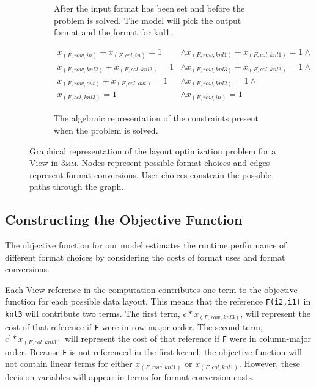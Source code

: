 \documentclass[sigconf,review=true]{acmart}
\begin{document}
\begin{figure}
\begin{subfigure}[t]{0.2\textwidth}
		\caption{After the input format has been set and before the problem is solved. The model will pick the output format and the format for knl1.}
		\label{graphModel:4}
	\end{subfigure}

	\vspace{5px}

	\begin{subfigure}{0.45\textwidth}
		\begin{align*}
			x_{(F,row,in)} + x_{(F,col,in)} = 1 &\wedge 
		x_{(F,row,knl1)} + x_{(F,col,knl1)} = 1 \wedge \\
		x_{(F,row,knl2)} + x_{(F,col,knl2)} = 1 &\wedge 
		x_{(F,row,knl3)} + x_{(F,col,knl3)} = 1 \wedge \\
		x_{(F,row,out)} + x_{(F,col,out)} = 1 &\wedge 
		x_{(F,row,knl2)} = 1 \wedge\\
		 x_{(F,col,knl3)} = 1 &\wedge x_{(F,row,in)} = 1
		\end{align*}
		
		\caption{The algebraic representation of the constraints present when the problem is solved.}
		\label{graphModel:5}
	\end{subfigure}

	\caption{Graphical representation of the layout optimization problem for a View in \textsc{3mm}. Nodes represent possible format choices and edges represent format conversions. User choices constrain the possible paths through the graph.}
	\label{graphModel}
\end{figure}

\subsection{Constructing the Objective Function}

The objective function for our model estimates the runtime performance of different format choices by considering the costs of format uses and format conversions.

Each View reference in the computation contributes one term to the objective function for each possible data layout. This means that the reference \verb.F(i2,i1). in \verb.knl3. will contribute two terms.
The first term,  $c * x_{(F,row,knl3)}$, will represent the cost of that reference if \verb.F. were in row-major order. 
The second term, $c^\prime * x_{(F,col,knl3)}$ will represent the cost of that reference if \verb.F. were in column-major order.
Because \verb.F. is not referenced in the first kernel, the objective function will not contain linear terms for either $x_{(F,row,knl1)}$ or $x_{(F,col,knl1)}$.
However, these decision variables will appear in terms for format conversion costs.
\end{document}
